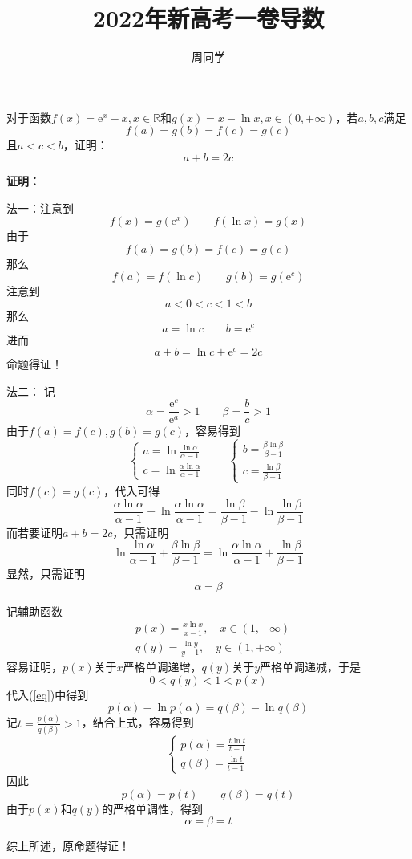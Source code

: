\documentclass[UTF8]{ctexart}
\title{2022年新高考一卷导数}
\author{周同学}
\begin{document}
	
\maketitle

\newpage


对于函数$ f(x)=\mathrm{e}^{x}-x,x\in\mathbb{R} $和$ g(x)=x-\ln{x},x\in(0,+\infty) $，若$ a,b,c $满足
\[ f(a)=g(b)=f(c)=g(c) \]
且$ a<c<b $，证明：
\[ a+b=2c \]

{\bfseries 证明：}

法一：注意到
\[ f(x)=g(\mathrm{e}^{x}) \qquad f(\ln{x})=g(x) \]
由于
\[ f(a)=g(b)=f(c)=g(c) \]
那么
\[ f(a)=f(\ln{c}) \qquad g(b)=g(\mathrm{e}^{c}) \]
注意到
\[ a<0<c<1<b \]
那么
\[ a=\ln{c} \qquad b=\mathrm{e}^{c} \]
进而
\[ a+b=\ln{c}+\mathrm{e}^{c}=2c \]
命题得证！

\newpage

法二：
记
\[ \alpha=\frac{\mathrm{e}^{c}}{\mathrm{e}^{a}}>1 \qquad \beta=\frac{b}{c}>1 \]
由于$ f(a)=f(c),g(b)=g(c) $，容易得到
\begin{equation*}
	\begin{cases}
		a=\ln{\frac{\ln{\alpha}}{\alpha-1}}\\
		c=\ln{\frac{\alpha\ln{\alpha}}{\alpha-1}}
	\end{cases}
	\qquad
	\begin{cases}
		b=\frac{\beta\ln{\beta}}{\beta-1}\\
		c=\frac{\ln{\beta}}{\beta-1}
	\end{cases}
\end{equation*}
同时$ f(c)=g(c) $，代入可得
\[ \frac{\alpha\ln{\alpha}}{\alpha-1}-\ln{\frac{\alpha\ln{\alpha}}{\alpha-1}}=\frac{\ln{\beta}}{\beta-1}-\ln{\frac{\ln{\beta}}{\beta-1}}\label{eq}\tag{*} \]
而若要证明$ a+b=2c $，只需证明
\[ \ln{\frac{\ln{\alpha}}{\alpha-1}}+\frac{\beta\ln{\beta}}{\beta-1}=\ln{\frac{\alpha\ln{\alpha}}{\alpha-1}}+\frac{\ln{\beta}}{\beta-1} \]
显然，只需证明
\[ \alpha=\beta \]

记辅助函数
\begin{align*}
	&p(x)=\frac{x\ln{x}}{x-1},\quad x\in(1,+\infty)\\
	&q(y)=\frac{\ln{y}}{y-1},\quad y\in(1,+\infty)
\end{align*}
容易证明，$ p(x) $关于$ x $严格单调递增，$ q(y) $关于$ y $严格单调递减，于是
\[ 0<q(y)<1<p(x) \]代入(\ref{eq})中得到
\[ p(\alpha)-\ln{p(\alpha)}=q(\beta)-\ln{q(\beta)} \]
记$ t=\frac{p(\alpha)}{q(\beta)}>1 $，结合上式，容易得到
\begin{equation*}
	\begin{cases}
		p(\alpha)=\frac{t\ln{t}}{t-1}\\
		q(\beta)=\frac{\ln{t}}{t-1}
	\end{cases}
\end{equation*}
因此
\[ p(\alpha)=p(t) \qquad q(\beta)=q(t) \]
由于$ p(x) $和$ q(y) $的严格单调性，得到
\[ \alpha=\beta=t \]

综上所述，原命题得证！
\end{document}
